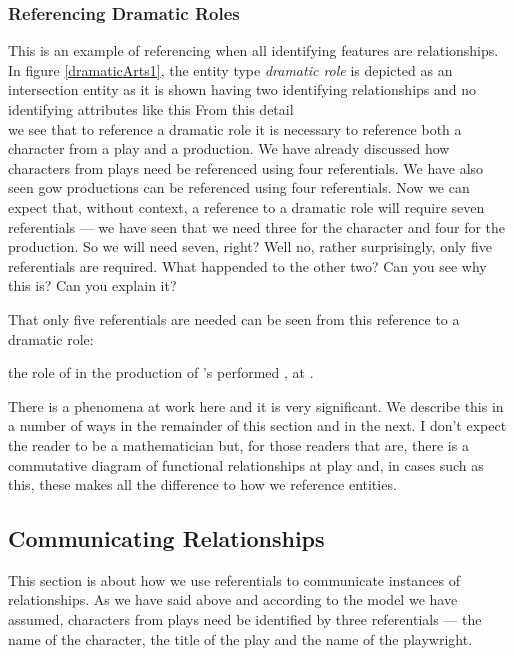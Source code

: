  \subsubsection{Referencing Dramatic Roles}
 \mynote
 This is an example of referencing when all identifying features are relationships.
\mynote
In figure \ref{dramaticArts1}, the entity type \textit{dramatic role} is
depicted as an intersection entity as it is shown having
two identifying relationships and no identifying attributes like this
From this detail 
\begin{equation*}

\end{equation*}
we see that to reference a dramatic role it is necessary to reference
both a character from a play and a production. 
We have already discussed how characters from plays need be referenced using four referentials.
We have also seen gow productions can be referenced using four referentials.  
\mynote
Now we can expect that, without context, a reference to
a dramatic role will require seven referentials
 ---  we have seen that we need three for the character and four for the production. 
So we will need seven, right?
 Well no, rather surprisingly, only five referentials are required. 
 What happended to the other two? Can you see why this is? Can you explain it?

That only five referentials are needed can be seen from this reference to a dramatic role:

\begin{erquote}
\parbox{9.0cm}{the role of  in the production of \mbox{'s}  performed \mbox{,} at .
}
\end{erquote}

There is a phenomena at work here and it is very significant. We describe this in a number of ways in the remainder of this section and in the next. I don't expect the reader to be a mathematician but, for those readers that are, there is a commutative diagram of functional relationships at play and, in cases such as this, these makes all the difference to how we reference entities.



\subsection{Communicating Relationships}

\mynote This section is about how we use referentials to communicate instances of relationships.
As we have said above and according to the model we have assumed,
  characters from plays need be identified by three referentials
 --- the name of the character, the title of the play and the name of the playwright.

